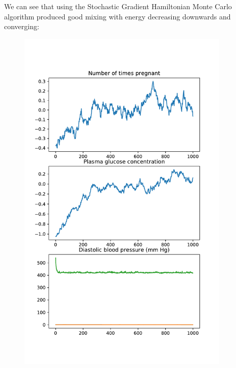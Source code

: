 We can see that using the Stochastic Gradient Hamiltonian Monte Carlo algorithm produced good mixing with energy decreasing downwards and converging:

\begin{figure}[H]
	\centering
	\begin{minipage}{0.45\textwidth}
		\centering
		\includegraphics[width=0.9\textwidth]{sghmc-energy-pima.pdf} %
	\end{minipage}\hfill
	\begin{minipage}{0.45\textwidth}
		\centering

\end{minipage}
\end{figure}
